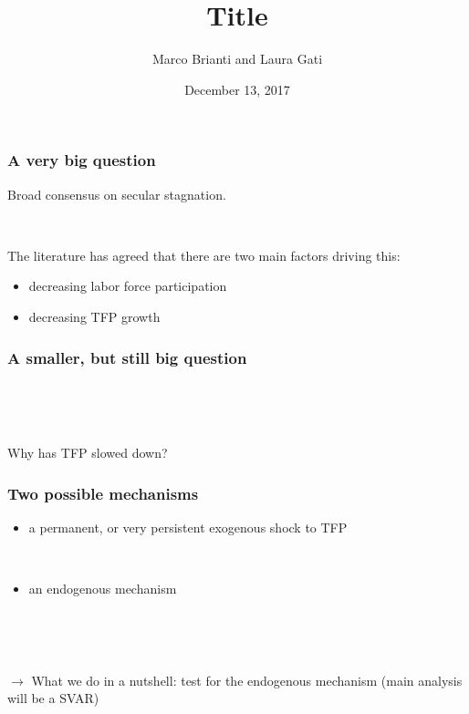 \documentclass{beamer}
\author[Brianti, Gati]{Marco Brianti and Laura Gati}
\institute[Boston College]{Boston College}
\title{Title}
\date{December 13, 2017}
\begin{document}
\begin{frame}

\maketitle


\end{frame}

\begin{frame}
	\frametitle{A very big question}
	
Broad consensus on secular stagnation.


\

The literature has agreed that there are two main factors driving this:
\begin{itemize}
\item decreasing labor force participation
\item decreasing TFP growth
\end{itemize}
	
	


\end{frame}

\begin{frame}
	\frametitle{A smaller, but still big question}
	
	\
	
	\
	
	Why has TFP slowed down? %
	
	
\end{frame}

\begin{frame}
	\frametitle{Two possible mechanisms}
	
\begin{itemize}
\item a permanent, or very persistent exogenous shock to TFP

\

\item an endogenous mechanism
\end{itemize}	

\

\

$\rightarrow$ What we do in a nutshell: test for the endogenous mechanism (main analysis will be a SVAR)


\end{frame}
\end{document}
